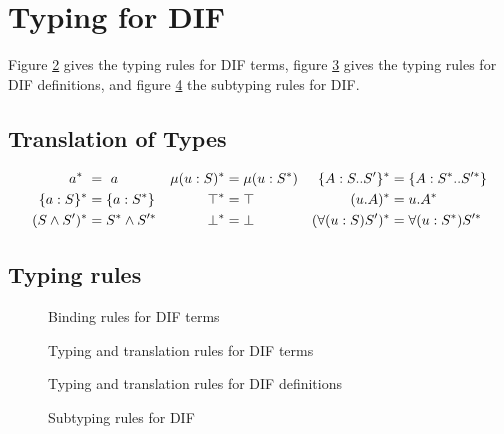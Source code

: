 \section{Typing for DIF}
Figure \ref{typing_rules_terms} gives the typing rules for DIF terms, figure
\ref{typing_rules_definitions} gives the typing rules for DIF definitions, and
figure \ref{subtyping_rules} the subtyping rules for DIF.

\subsection{Translation of Types}

\begin{DEFINITION}
    \label{TransTy}
    \begin{align*}
        a^{*} \                     &= \ a
            & \mu(u : S)^{*}        &= \mu(u : S^{*})
            & \{A : S .. S'\}^{*}   &= \{A : S^{*} .. S'^{*}\} \\
        \{a : S\}^{*}             &= \{a : S^{*}\}
            & \top^{*}              &= \top
            & (u.A)^{*}             &= u.A^{*}                     \\
        (S \wedge S')^{*}           &= S^{*} \wedge S'^{*}
            & \bot^{*}              &= \bot
            & (\forall(u:S)S')^{*} &= \forall(u:S^{*})S'^{*} \\
    \end{align*}
\end{DEFINITION}

\subsection{Typing rules}

\begin{figure}[h]
    
    \caption{Binding rules for DIF terms}
    \label{binding_rules}
\end{figure}

\begin{figure}[h]
    
    \caption{Typing and translation rules for DIF terms}
    \label{typing_rules_terms}
\end{figure}

\begin{figure}[h]
    
    \caption{Typing and translation rules for DIF definitions}
    \label{typing_rules_definitions}
\end{figure}

\begin{figure}[h]
    
    \caption{Subtyping rules for DIF}
    \label{subtyping_rules}
\end{figure}
